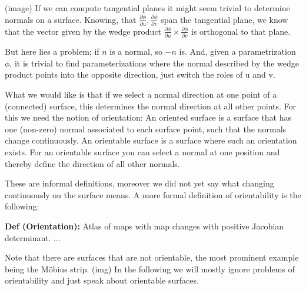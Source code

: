 (image)
If we can compute tangential planes it might seem trivial to determine normals on a surface. Knowing, that $\frac{\partial \phi} {\partial u}, \frac{\partial \phi} {\partial v}$ span the tangential plane, we know that the vector given by the wedge product $\frac{\partial \phi} {\partial u} \times \frac{\partial \phi} {\partial v}$ is orthogonal to that plane.

But here lies a problem; if $n$ is a normal, so $-n$ is. And, given a parametrization $\phi$, it is trivial to find parameterizations where the normal described by the wedge product points into the opposite direction, just switch the roles of u and v.

What we would like is that if we select a normal direction at one point of a (connected) surface, this determines the normal direction at all other points. For this we need the notion of orientation: An oriented surface is a surface that has one (non-zero) normal associated to each surface point, such that the normals change continuously. An orientable surface is a surface where such an orientation exists. For an orientable surface you can select a normal at one position and thereby define the direction of all other normals.

These are informal definitions, moreover we did not yet say what changing continuously on the surface means. A more formal definition of orientability is the following:

\textbf{Def (Orientation):} Atlas of maps with map changes with positive Jacobian determinant. ...

Note that there are surfaces that are not orientable, the most prominent example being the M\"obius strip. (img) In the following we will mostly ignore problems of orientability and just speak about orientable surfaces.

